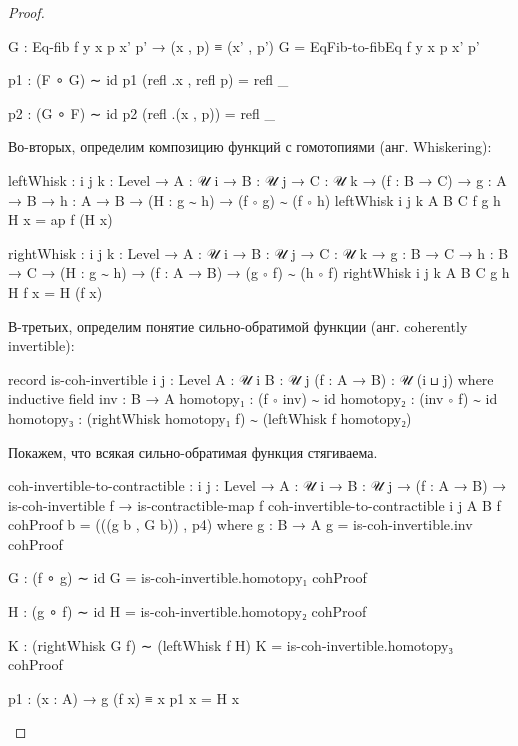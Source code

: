 \documentclass{article}[12pt]
\begin{document}
\begin{proof}
\begin{code}
        G : Eq-fib f y x p x' p' → (x , p) ≡ (x' , p')
        G = EqFib-to-fibEq f y x p x' p'

        p1 : (F ∘ G) ∼ id
        p1 (refl .x , refl p) = refl _

        p2 : (G ∘ F) ∼ id
        p2 (refl .(x , p)) = refl _            
\end{code} 

Во-вторых, определим композицию функций с гомотопиями (анг. Whiskering):
\begin{code}
leftWhisk : {i j k : Level} → {A : 𝒰 i} → {B : 𝒰 j} → {C : 𝒰 k}
            → (f : B → C)
            → {g : A → B} → {h : A → B} → (H : g ∼ h)
            → (f ∘ g) ∼ (f ∘ h)
leftWhisk {i} {j} {k} {A} {B} {C} f {g} {h} H x = ap f (H x)

rightWhisk : {i j k : Level} → {A : 𝒰 i} → {B : 𝒰 j} → {C : 𝒰 k}
             → {g : B → C} → {h : B → C} → (H : g ∼ h)
             → (f : A → B)
             → (g ∘ f) ∼ (h ∘ f)
rightWhisk {i} {j} {k} {A} {B} {C} {g} {h} H f x = H (f x)
\end{code}
В-третьих, определим понятие сильно-обратимой функции (анг. coherently invertible):
\begin{code}
record is-coh-invertible {i j : Level} {A : 𝒰 i} {B : 𝒰 j} (f : A → B) : 𝒰 (i ⊔ j) where
    inductive
    field
        inv : B → A
        homotopy₁ : (f ∘ inv) ∼ id
        homotopy₂ : (inv ∘ f) ∼ id
        homotopy₃ : (rightWhisk homotopy₁ f) ∼ (leftWhisk f homotopy₂)
\end{code}

Покажем, что всякая сильно-обратимая функция стягиваема.
\begin{code}
coh-invertible-to-contractible : {i j : Level} → {A : 𝒰 i} → {B : 𝒰 j}
                                 → (f : A → B)
                                 → is-coh-invertible f
                                 → is-contractible-map f
coh-invertible-to-contractible {i} {j} {A} {B} f cohProof b = (((g b , G b)) , p4)
    where
        g : B → A
        g = is-coh-invertible.inv cohProof

        G : (f ∘ g) ∼ id
        G = is-coh-invertible.homotopy₁ cohProof

        H : (g ∘ f) ∼ id
        H = is-coh-invertible.homotopy₂ cohProof

        K : (rightWhisk G f) ∼ (leftWhisk f H)
        K = is-coh-invertible.homotopy₃ cohProof

        p1 : (x : A) → g (f x) ≡ x
        p1 x = H x


\end{code}
\end{proof}
\end{document}
